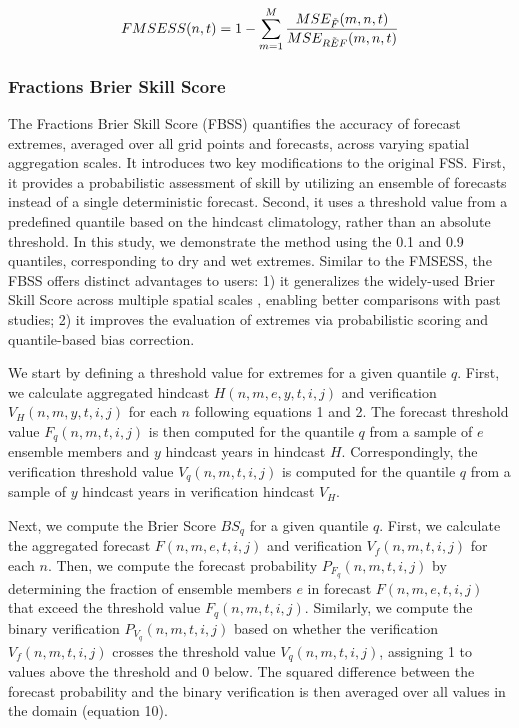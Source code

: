\documentclass[preprint,12pt,authoryear]{elsarticle}
\begin{document}
\begin{equation}
    FMSESS(n,t) = 1 - \sum_{m=1}^{M} \frac{MSE_{\Tilde{F}}(m,n,t)}{MSE_{\Tilde{REF}}(m,n,t)}
\end{equation}




\subsubsection{Fractions Brier Skill Score}


The Fractions Brier Skill Score (FBSS) quantifies the accuracy of forecast extremes, averaged over all grid points and forecasts, across varying spatial aggregation scales. It introduces two key modifications to the original FSS. First, it provides a probabilistic assessment of skill by utilizing an ensemble of forecasts instead of a single deterministic forecast. Second, it uses a threshold value from a predefined quantile based on the hindcast climatology, rather than an absolute threshold. In this study, we demonstrate the method using the 0.1 and 0.9 quantiles, corresponding to dry and wet extremes. Similar to the FMSESS, the FBSS offers distinct advantages to users: 1) it generalizes the widely-used Brier Skill Score across multiple spatial scales \citep{jolliffeStephenson2012}, enabling better comparisons with past studies; 2) it improves the evaluation of extremes via probabilistic scoring and quantile-based bias correction.
 

We start by defining a threshold value for extremes for a given quantile $q$. First, we calculate aggregated hindcast $H(n,m,e,y,t,i,j)$ and verification $V_{H}(n,m,y,t,i,j)$ for each $n$ following equations 1 and 2. The forecast threshold value $F_{q}(n,m,t,i,j)$ is then computed for the quantile $q$ from a sample of $e$ ensemble members and $y$ hindcast years in hindcast $H$. Correspondingly, the verification threshold value $V_{q}(n,m,t,i,j)$ is computed for the quantile $q$ from a sample of $y$ hindcast years in verification hindcast $V_{H}$.  


Next, we compute the Brier Score $BS_{q}$ for a given quantile $q$. First, we calculate the aggregated forecast $F(n,m,e,t,i,j)$ and verification $V_{f}(n,m,t,i,j)$ for each $n$. Then, we compute the forecast probability $P_{F_{q}}(n,m,t,i,j)$ by determining the fraction of ensemble members $e$ in forecast $F(n,m,e,t,i,j)$ that exceed the threshold value $F_{q}(n,m,t,i,j)$. Similarly, we compute the binary verification $P_{V_{q}}(n,m,t,i,j)$ based on whether the verification $V_{f}(n,m,t,i,j)$ crosses the threshold value $V_{q}(n,m,t,i,j)$, assigning 1 to values above the threshold and 0 below. The squared difference between the forecast probability and the binary verification is then averaged over all values in the domain (equation 10).
\end{document}
